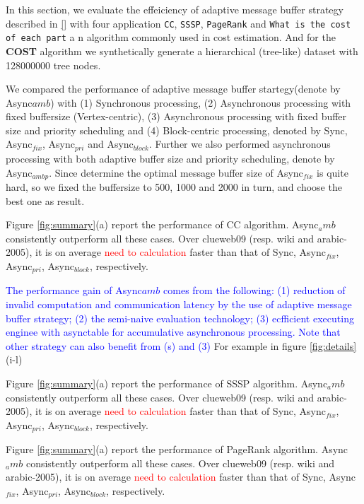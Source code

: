 In this section, we evaluate the effeiciency of adaptive message buffer strategy described in \ref{} with four application \texttt{CC}, \texttt{SSSP}, \texttt{PageRank} and \texttt{What is the cost of each part}\cite{7113340} a n algorithm commonly used in cost estimation. And for the \textbf{COST} algorithm we synthetically generate a hierarchical (tree-like) dataset with 128000000 tree nodes.

We compared the performance of adaptive message buffer startegy(denote by Async${amb}$) with (1) Synchronous processing, (2) Asynchronous processing with fixed buffersize (Vertex-centric), (3) Asynchronous processing with fixed buffer size and priority scheduling and (4) Block-centric processing, denoted by Sync, Async$_{fix}$, Async$_{pri}$ and Async$_{block}$. Further we also performed asynchronous processing with both adaptive buffer size and priority scheduling, denote by Async$_{ambp}$. Since determine the optimal message buffer size of Async$_{fix}$ is quite hard, so we fixed the buffersize to 500, 1000 and 2000 in turn, and choose the best one as result.


 Figure \ref{fig:summary}(a) report the performance of CC algorithm. Async$_amb$ consistently outperform all these cases. Over clueweb09 (resp. wiki and arabic-2005), it is on average \textcolor{red}{need to calculation} faster than that of Sync, Async$_{fix}$, Async$_{pri}$, Async$_{block}$, respectively. 

\textcolor{blue}{
The performance gain of Async$amb$ comes from the following:
(1) reduction of invalid computation and communication latency by the use of adaptive message buffer strategy; 
(2) the semi-naive evaluation technology;
(3) ecfficient executing enginee with asynctable for accumulative asynchronous processing.
Note that other strategy can also benefit from (s) and (3)}
For example in figure \ref{fig:details}(i-l)


 Figure \ref{fig:summary}(a) report the performance of SSSP algorithm. Async$_amb$ consistently outperform all these cases. Over clueweb09 (resp. wiki and arabic-2005), it is on average \textcolor{red}{need to calculation} faster than that of Sync, Async$_{fix}$, Async$_{pri}$, Async$_{block}$, respectively. 


 Figure \ref{fig:summary}(a) report the performance of PageRank algorithm. Async$_amb$ consistently outperform all these cases. Over clueweb09 (resp. wiki and arabic-2005), it is on average \textcolor{red}{need to calculation} faster than that of Sync, Async$_{fix}$, Async$_{pri}$, Async$_{block}$, respectively. 


